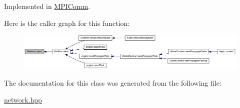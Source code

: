 Implemented in \hyperlink{class_m_p_i_comm_a878df4e9c57f117f192a8bfee009ff94}{MPIComm}.

Here is the caller graph for this function:\nopagebreak
\begin{figure}[H]
\begin{center}
\leavevmode
\includegraphics[width=420pt]{class_i_network_a4996a6c20805f604c5afff707313ed4e_icgraph}
\end{center}
\end{figure}


The documentation for this class was generated from the following file:\begin{DoxyCompactItemize}
\item 
\hyperlink{network_8hpp}{network.hpp}\end{DoxyCompactItemize}
